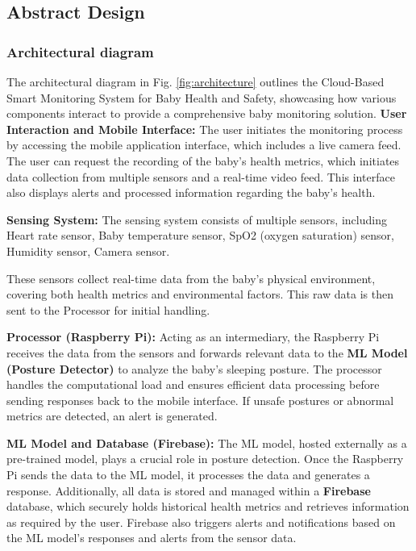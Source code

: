 \documentclass[conference]{IEEEtran}
\begin{document}
\subsection{Abstract Design}

\subsubsection{Architectural diagram}

The architectural diagram in Fig. \ref{fig:architecture} outlines the Cloud-Based Smart Monitoring System for Baby Health and Safety, showcasing how various components interact to provide a comprehensive baby monitoring solution.
\textbf{User Interaction and Mobile Interface:} The user initiates the monitoring process by accessing the mobile application interface, which includes a live camera feed. The user can request the recording of the baby’s health metrics, which initiates data collection from multiple sensors and a real-time video feed. This interface also displays alerts and processed information regarding the baby’s health.

\textbf{Sensing System:} The sensing system consists of multiple sensors, including Heart rate sensor, Baby temperature sensor, SpO2 (oxygen saturation) sensor, Humidity sensor, Camera sensor.

These sensors collect real-time data from the baby’s physical environment, covering both health metrics and environmental factors. This raw data is then sent to the Processor for initial handling.

\textbf{Processor (Raspberry Pi):} Acting as an intermediary, the Raspberry Pi receives the data from the sensors and forwards relevant data to the \textbf{ML Model (Posture Detector)} to analyze the baby’s sleeping posture. The processor handles the computational load and ensures efficient data processing before sending responses back to the mobile interface. If unsafe postures or abnormal metrics are detected, an alert is generated.

\textbf{ML Model and Database (Firebase):} The ML model, hosted externally as a pre-trained model, plays a crucial role in posture detection. Once the Raspberry Pi sends the data to the ML model, it processes the data and generates a response. Additionally, all data is stored and managed within a \textbf{Firebase} database, which securely holds historical health metrics and retrieves information as required by the user. Firebase also triggers alerts and notifications based on the ML model’s responses and alerts from the sensor data.
\end{document}

